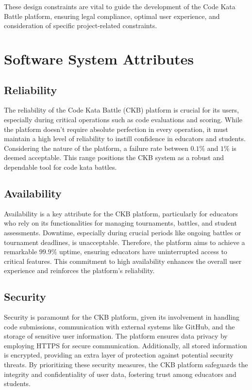 These design constraints are vital to guide the development of the Code Kata Battle platform, ensuring legal compliance, optimal user experience, and consideration of specific project-related constraints.



\newpage
\section{Software System Attributes}
\label{sec:software_system_attributes}%

\subsection{Reliability}
\label{subsec:reliability}%
The reliability of the Code Kata Battle (CKB) platform is crucial for its users, especially during critical operations such as code evaluations and scoring. 
While the platform doesn't require absolute perfection in every operation, it must maintain a high level of reliability to instill confidence in educators and students. 
Considering the nature of the platform, a failure rate between $0.1\%$ and $1\%$ is deemed acceptable. 
This range positions the CKB system as a robust and dependable tool for code kata battles.

\subsection{Availability}
\label{subsec:availability}%
Availability is a key attribute for the CKB platform, particularly for educators who rely on its functionalities for managing tournaments, battles, and student assessments. 
Downtime, especially during crucial periods like ongoing battles or tournament deadlines, is unacceptable. Therefore, the platform aims to achieve a remarkable $99.9\%$ uptime, ensuring educators have uninterrupted access to critical features. 
This commitment to high availability enhances the overall user experience and reinforces the platform's reliability.

\subsection{Security}
\label{subsec:security}%
Security is paramount for the CKB platform, given its involvement in handling code submissions, communication with external systems like GitHub, and the storage of sensitive user information. 
The platform ensures data privacy by employing HTTPS for secure communication. Additionally, all stored information is encrypted, providing an extra layer of protection against potential security threats. 
By prioritizing these security measures, the CKB platform safeguards the integrity and confidentiality of user data, fostering trust among educators and students.

